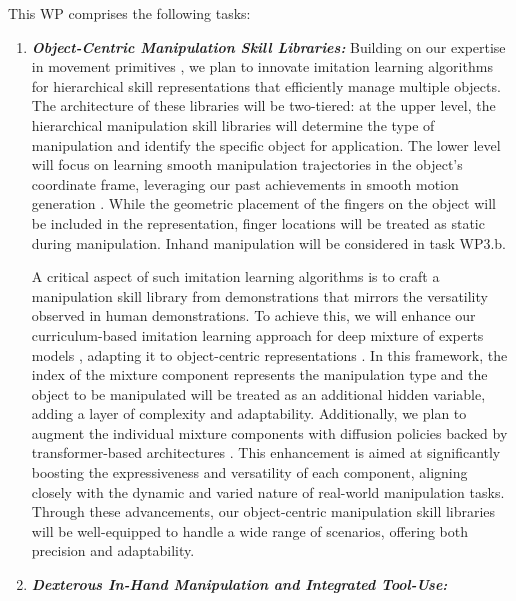 \documentclass{erc-B2}
\begin{document}
This WP comprises the following tasks:
\begin{enumerate}%
\item \textit{\textbf{Object-Centric Manipulation Skill Libraries:}}  Building on our expertise \cite{paraschos2013probabilistic, li2023prodmp} in movement primitives \cite{schaal2006dynamic}, we plan to innovate imitation learning algorithms for hierarchical skill representations that efficiently manage multiple objects. The architecture of these libraries will be two-tiered: at the upper level, the hierarchical manipulation skill libraries will determine the type of manipulation and identify the specific object for application. The lower level will focus on learning smooth manipulation trajectories in the object's coordinate frame, leveraging our past achievements in smooth motion generation \cite{li2023prodmp}. While the geometric placement of the fingers on the object will be included in the representation, finger locations will be treated as static during manipulation. Inhand manipulation will be considered in task WP3.b. 

A critical aspect of such imitation learning algorithms is to craft a manipulation skill library from demonstrations that mirrors the versatility observed in human demonstrations. To achieve this, we will enhance our curriculum-based imitation learning approach for deep mixture of experts models \cite{blessing2023information}, adapting it to object-centric representations \cite{carvalho2022adapting, Jianfeng2023KVIL} . In this framework, the index of the mixture component represents the manipulation type and the object to be manipulated will be treated as an additional hidden variable, adding a layer of complexity and adaptability. Additionally, we plan to augment the individual mixture components with diffusion policies backed by transformer-based architectures . This enhancement is aimed at significantly boosting the expressiveness and versatility of each component, aligning closely with the dynamic and varied nature of real-world manipulation tasks. Through these advancements, our object-centric manipulation skill libraries will be well-equipped to handle a wide range of scenarios, offering both precision and adaptability. 

\item \textit{\textbf{Dexterous In-Hand Manipulation and Integrated Tool-Use:}}


\end{enumerate}
\end{document}
